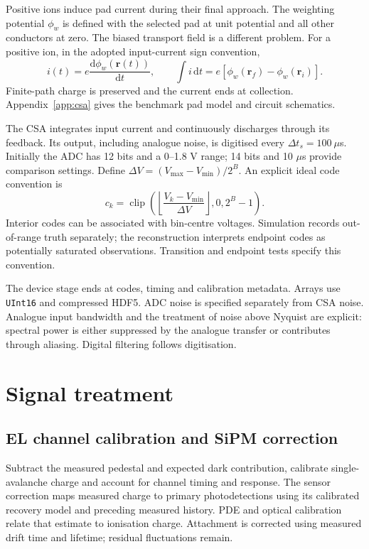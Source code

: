 \documentclass[11pt,a4paper]{article}
\newcommand{\dd}{\mathrm{d}}
\begin{document}
Positive ions induce pad current during their final approach. The weighting
potential $\phi_w$ is defined with the selected pad at unit potential and all
other conductors at zero. The biased transport field is a different problem.
For a positive ion, in the adopted input-current sign convention,
\begin{equation}
 i(t)=e\frac{\dd\phi_w(\mathbf r(t))}{\dd t},\qquad
 \int i\,\dd t=e[\phi_w(\mathbf r_f)-\phi_w(\mathbf r_i)].
\end{equation}
Finite-path charge is preserved and the current ends at collection.
Appendix~\ref{app:csa} gives the benchmark pad model and circuit schematics.

The CSA integrates input current and continuously discharges through its
feedback. Its output, including analogue noise, is digitised every
$\Delta t_s=100~\mu$s. Initially the ADC has 12 bits and a 0--1.8 V range;
14 bits and 10 $\mu$s provide comparison settings. Define
$\Delta V=(V_{\max}-V_{\min})/2^B$. An explicit ideal code convention is
\begin{equation}
 c_k=\operatorname{clip}\left(
 \left\lfloor\frac{V_k-V_{\min}}{\Delta V}\right\rfloor,0,2^B-1\right).
\end{equation}
Interior codes can be associated with bin-centre voltages. Simulation records
out-of-range truth separately; the reconstruction interprets endpoint codes
as potentially saturated observations. Transition and endpoint tests specify
this convention.

The device stage ends at codes, timing and calibration metadata. Arrays use
\texttt{UInt16} and compressed HDF5. ADC noise is specified separately from
CSA noise. Analogue input bandwidth and the treatment of noise above Nyquist
are explicit: spectral power is either suppressed by the analogue transfer
or contributes through aliasing. Digital filtering follows digitisation.

\FloatBarrier
\section{Signal treatment}
\subsection{EL channel calibration and SiPM correction}
Subtract the measured pedestal and expected dark contribution, calibrate
single-avalanche charge and account for channel timing and response. The
sensor correction maps measured charge to primary photodetections using its
calibrated recovery model and preceding measured history. PDE and optical
calibration relate that estimate to ionisation charge. Attachment is corrected
using measured drift time and lifetime; residual fluctuations remain.
\end{document}
